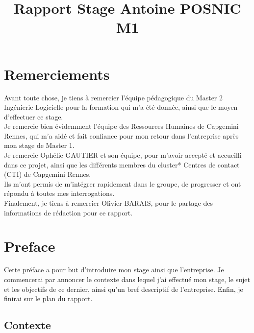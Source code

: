 \documentclass{rapport}
\title{Rapport Stage Antoine POSNIC M1} %
\begin{document}






\fairemarges %
\fairepagedegarde %
\afterpage{\null\newpage}
\tabledematieres %

\section*{Remerciements}
Avant toute chose, je tiens à remercier l'équipe pédagogique du Master 2 Ingénierie Logicielle pour la formation qui m'a été donnée, ainsi que le moyen d'effectuer ce stage.\\
Je remercie bien évidemment l'équipe des Ressources Humaines de Capgemini Rennes, qui m'a aidé et fait confiance pour mon retour dans l'entreprise après mon stage de Master 1.\\
Je remercie Ophélie GAUTIER et son équipe, pour m'avoir accepté et accueilli dans ce projet, ainsi que les différents membres du cluster* Centres de contact (CTI) de Capgemini Rennes.\\
Ils m'ont permis de m'intégrer rapidement dans le groupe, de progresser et ont répondu à toutes mes interrogations.\\
Finalement, je tiens à remercier Olivier BARAIS, pour le partage des informations de rédaction pour ce rapport.

\newpage
\section*{Preface}
Cette préface a pour but d'introduire mon stage ainsi que l'entreprise. Je commencerai par annoncer le contexte dans lequel j'ai effectué mon stage, le sujet et les objectifs de ce dernier, ainsi qu'un bref descriptif de l'entreprise. Enfin, je finirai sur le plan du rapport.

\subsection*{Contexte}
\end{document}
